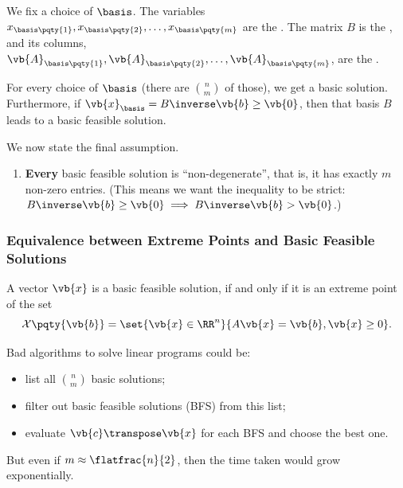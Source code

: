 \begin{definition}
    We fix a choice of \(\basis\). The variables \(x_{\basis\pqty{1}}, x_{\basis\pqty{2}}, \ldots, x_{\basis\pqty{m}}\) are the . The matrix \(B\) is the , and its columns, \(\vb{A}_{\basis\pqty{1}}, \vb{A}_{\basis\pqty{2}}, \ldots, \vb{A}_{\basis\pqty{m}}\), are the .
\end{definition}

For every choice of \(\basis\) (there are \(\binom{n}{m}\) of those), we get a basic solution. Furthermore, if \(\vb{x}_{\basis} = B\inverse \vb{b} \geq \vb{0}\), then that basis \(B\) leads to a basic feasible solution.

We now state the final assumption.

\begin{enumerate}[resume*]
    \item \textbf{Every} basic feasible solution is ``non-degenerate'', that is, it has exactly \(m\) non-zero entries. (This means we want the inequality to be strict: \(B\inverse \vb{b} \geq \vb{0} \implies B\inverse \vb{b} > \vb{0}\).)
\end{enumerate}

\subsubsection{Equivalence between Extreme Points and Basic Feasible Solutions}

\begin{theorem}
    A vector \(\vb{x}\) is a basic feasible solution, if and only if it is an extreme point of the set
    \[
        \mathcal{X} \pqty{\vb{b}} = \set{\vb{x} \in \RR^n}{A\vb{x} = \vb{b}, \vb{x} \geq 0}.
    \]
\end{theorem}

\begin{remark}
    Bad algorithms to solve linear programs could be:
    \begin{itemize}
        \item list all \(\binom{n}{m}\) basic solutions;
        \item filter out basic feasible solutions (BFS) from this list;
        \item evaluate \(\vb{c}\transpose \vb{x}\) for each BFS and choose the best one.
    \end{itemize}

    But even if \(m \approx \flatfrac{n}{2}\), then the time taken would grow exponentially.
\end{remark}

